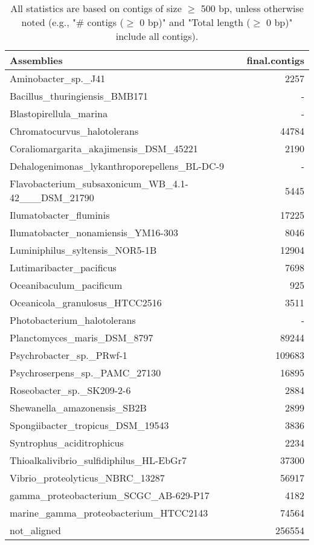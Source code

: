 \documentclass[12pt,a4paper]{article}
\begin{document}
\begin{table}[ht]
\begin{center}
\caption{All statistics are based on contigs of size $\geq$ 500 bp, unless otherwise noted (e.g., "\# contigs ($\geq$ 0 bp)" and "Total length ($\geq$ 0 bp)" include all contigs).}
\begin{tabular}{|l*{1}{|r}|}
\hline
Assemblies & final.contigs \\ \hline
Aminobacter\_sp.\_J41 & 2257 \\ \hline
Bacillus\_thuringiensis\_BMB171 & - \\ \hline
Blastopirellula\_marina & - \\ \hline
Chromatocurvus\_halotolerans & 44784 \\ \hline
Coraliomargarita\_akajimensis\_DSM\_45221 & 2190 \\ \hline
Dehalogenimonas\_lykanthroporepellens\_BL-DC-9 & - \\ \hline
Flavobacterium\_subsaxonicum\_WB\_4.1-42\_\_\_DSM\_21790 & 5445 \\ \hline
Ilumatobacter\_fluminis & 17225 \\ \hline
Ilumatobacter\_nonamiensis\_YM16-303 & 8046 \\ \hline
Luminiphilus\_syltensis\_NOR5-1B & 12904 \\ \hline
Lutimaribacter\_pacificus & 7698 \\ \hline
Oceanibaculum\_pacificum & 925 \\ \hline
Oceanicola\_granulosus\_HTCC2516 & 3511 \\ \hline
Photobacterium\_halotolerans & - \\ \hline
Planctomyces\_maris\_DSM\_8797 & 89244 \\ \hline
Psychrobacter\_sp.\_PRwf-1 & 109683 \\ \hline
Psychroserpens\_sp.\_PAMC\_27130 & 16895 \\ \hline
Roseobacter\_sp.\_SK209-2-6 & 2884 \\ \hline
Shewanella\_amazonensis\_SB2B & 2899 \\ \hline
Spongiibacter\_tropicus\_DSM\_19543 & 3836 \\ \hline
Syntrophus\_aciditrophicus & 2234 \\ \hline
Thioalkalivibrio\_sulfidiphilus\_HL-EbGr7 & 37300 \\ \hline
Vibrio\_proteolyticus\_NBRC\_13287 & 56917 \\ \hline
gamma\_proteobacterium\_SCGC\_AB-629-P17 & 4182 \\ \hline
marine\_gamma\_proteobacterium\_HTCC2143 & 74564 \\ \hline
not\_aligned & 256554 \\ \hline
\end{tabular}
\end{center}
\end{table}
\end{document}
